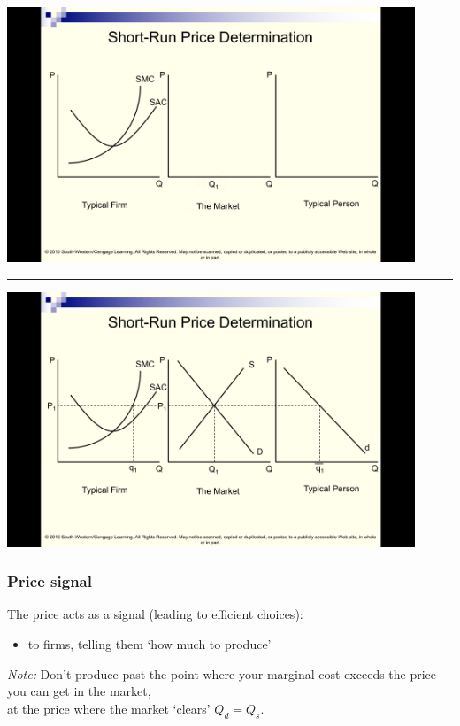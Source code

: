 \documentclass[]{article}
\providecommand{\tightlist}{%
  \setlength{\itemsep}{0pt}\setlength{\parskip}{0pt}}
\begin{document}
\includegraphics[height=3in]{picsfigs/srpd1.png}

\begin{center}\rule{0.5\linewidth}{\linethickness}\end{center}

\includegraphics[height=3in]{picsfigs/srpd6.png}

\hypertarget{price-signal}{%
\subsubsection{Price signal}\label{price-signal}}

The price acts as a signal (leading to efficient choices):

\begin{itemize}
\tightlist
\item
  to firms, telling them `how much to produce'
\end{itemize}

\emph{Note:} Don't produce past the point where your marginal cost
exceeds the price you can get in the market,\\
at the price where the market `clears' \(Q_d=Q_s\).
\end{document}
